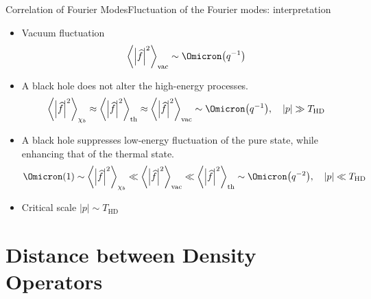 \documentclass{beamer}
\newcommand{\abr}[1]{{\left<#1\right>}}
\newcommand{\vbr}[1]{{\left|#1\right|}}
\newcommand{\rfun}[2]{{#1}\mathopen{}\left(#2\right)\mathclose{}}
\newcommand{\what}[1]{{\widehat{#1}}}
\begin{document}
\begin{frame}{Correlation of Fourier Modes}{Fluctuation of the Fourier 
modes: interpretation}

\begin{itemize}
	\item Vacuum fluctuation
	\begin{equation}
	\abr{\vbr{\what{f}}^2}_\text{vac} \sim \rfun{\Omicron}{q^{-1}}
	\end{equation}

	\item A black hole does \alert{not} alter the \alert{high}-energy
	processes.
	\begin{equation}
	\abr{\vbr{\what{f}}^2}_{\chi_b} \approx
	\abr{\vbr{\what{f}}^2}_\text{th} \approx
	\abr{\vbr{\what{f}}^2}_\text{vac} \sim \rfun{\Omicron}{q^{-1}},
	\quad \vbr{p} \gg T_\text{HD}
	\end{equation}

	\item A black hole \alert{suppresses} low-energy fluctuation of the
	\alert{pure} state, while \alert{enhancing} that of the
	\alert{thermal} state.
	\begin{equation}
	\rfun{\Omicron}{1} \sim \abr{\vbr{\what{f}}^2}_{\chi_b} \ll
	\abr{\vbr{\what{f}}^2}_\text{vac} \ll
	\abr{\vbr{\what{f}}^2}_\text{th} \sim \rfun{\Omicron}{q^{-2}},
	\quad \vbr{p} \ll T_\text{HD}
	\end{equation}
	\item Critical scale $\vbr{p} \sim T_\text{HD}$
\end{itemize}

\end{frame}

\section{Distance between Density Operators}



\end{document}
